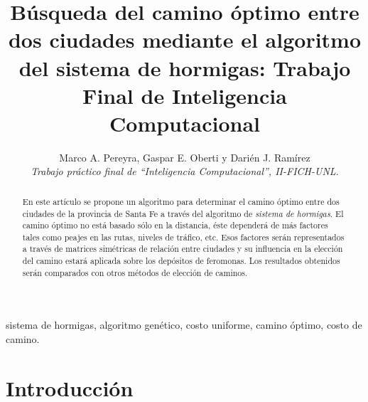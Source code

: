 \documentclass[conference,a4paper,10pt,oneside,final]{tfmpd}
\begin{document}
\title{Búsqueda del camino óptimo entre dos ciudades mediante el algoritmo del sistema de hormigas: Trabajo Final de Inteligencia Computacional}

\author{Marco A. Pereyra,
        Gaspar E. Oberti y 
        Darién J. Ramírez \\
\textit{Trabajo práctico final de ``Inteligencia Computacional'', II-FICH-UNL.}}


\maketitle

\begin{abstract}
En este artículo se propone un algoritmo para determinar el camino óptimo entre dos ciudades de la provincia de Santa Fe a través del algoritmo de \textit{sistema de hormigas}. El camino óptimo no está basado sólo en la distancia, éste dependerá de más factores tales como peajes en las rutas, niveles de tráfico, etc. Esos factores serán representados a través de matrices simétricas de relación entre ciudades y su influencia en la elección del camino estará aplicada sobre los depósitos de feromonas. Los resultados obtenidos serán comparados con otros métodos de elección de caminos.
\end{abstract}

\begin{keywords}
sistema de hormigas, algoritmo genético, costo uniforme, camino óptimo, costo de camino.
\end{keywords}

\section{Introducción}
\end{document}
